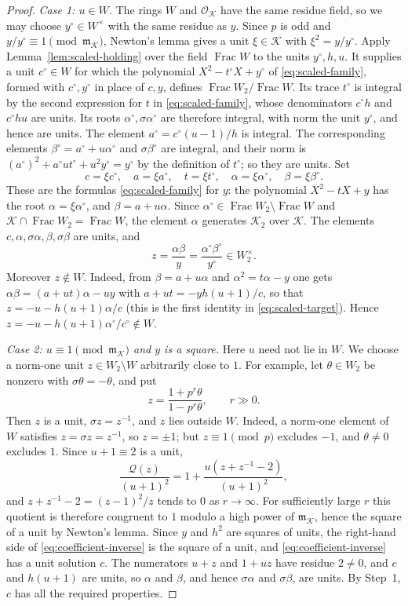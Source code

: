 \documentclass[11pt]{article}
\theoremstyle{plain}
\theoremstyle{definition}
\theoremstyle{remark}
\DeclareMathOperator{\Frac}{Frac}
\newcommand{\OO}{\mathcal O}
\begin{document}
\begin{proof}
\emph{Case 1: $u\in W$.}  The rings $W$ and $\OO_{\mathcal K}$ have the
same residue field, so we may choose $y^\circ\in W^\times$ with the same
residue as $y$.  Since $p$ is odd and $y/y^\circ\equiv1\pmod{\mathfrak
m_{\mathcal K}}$, Newton's lemma \cite[Theorem~7.32]{MilneANT} gives a
unit $\xi\in\mathcal K$ with $\xi^2=y/y^\circ$.  Apply
Lemma~\ref{lem:scaled-holding} over the field $\Frac W$ to the units
$y^\circ,h,u$.  It supplies a unit $c^\circ\in W$ for which the
polynomial $X^2-t^\circ X+y^\circ$ of \eqref{eq:scaled-family}, formed
with $c^\circ,y^\circ$ in place of $c,y$, defines $\Frac W_2/\Frac W$.
Its trace $t^\circ$ is integral by the second expression for $t$ in
\eqref{eq:scaled-family}, whose denominators $c^\circ h$ and
$c^\circ hu$ are units.  Its roots $\alpha^\circ,\sigma\alpha^\circ$ are
therefore integral, with norm the unit $y^\circ$, and hence are units.
The element $a^\circ=c^\circ(u-1)/h$ is integral.  The corresponding
elements $\beta^\circ=a^\circ+u\alpha^\circ$ and $\sigma\beta^\circ$ are
integral, and their norm is
$(a^\circ)^2+a^\circ ut^\circ+u^2y^\circ=y^\circ$ by the definition of
$t^\circ$; so they are units.  Set
\[
 c=\xi c^\circ,\quad a=\xi a^\circ,\quad t=\xi t^\circ,\quad
 \alpha=\xi\alpha^\circ,\quad\beta=\xi\beta^\circ.
\]
These are the formulas \eqref{eq:scaled-family} for $y$: the polynomial
$X^2-tX+y$ has the root $\alpha=\xi\alpha^\circ$, and
$\beta=a+u\alpha$.  Since $\alpha^\circ\in\Frac W_2\setminus\Frac W$ and
$\mathcal K\cap\Frac W_2=\Frac W$, the element $\alpha$ generates
$\mathcal K_2$ over $\mathcal K$.  The elements $c,\alpha,\sigma\alpha,
\beta,\sigma\beta$ are units, and
\[
 z=\frac{\alpha\beta}{y}=\frac{\alpha^\circ\beta^\circ}{y^\circ}\in
 W_2^\times.
\]
Moreover $z\notin W$.  Indeed, from $\beta=a+u\alpha$ and
$\alpha^2=t\alpha-y$ one gets $\alpha\beta=(a+ut)\alpha-uy$ with
$a+ut=-yh(u+1)/c$, so that $z=-u-h(u+1)\alpha/c$ (this is the first
identity in \eqref{eq:scaled-target}).  Hence
$z=-u-h(u+1)\alpha^\circ/c^\circ\notin W$.

\emph{Case 2: $u\equiv1\pmod{\mathfrak m_{\mathcal K}}$ and $y$ is a
square.}  Here $u$ need not lie in $W$.  We choose a norm-one unit
$z\in W_2\setminus W$ arbitrarily close to $1$.  For example, let
$\theta\in W_2$ be nonzero with $\sigma\theta=-\theta$, and put
\[
 z=\frac{1+p^r\theta}{1-p^r\theta},\qquad r\gg0.
\]
Then $z$ is a unit, $\sigma z=z^{-1}$, and $z$ lies outside $W$.
Indeed, a norm-one element of $W$ satisfies $z=\sigma z=z^{-1}$, so
$z=\pm1$; but $z\equiv1\pmod p$ excludes $-1$, and $\theta\ne0$
excludes $1$.  Since $u+1\equiv2$ is a unit,
\[
 \frac{\mathcal Q(z)}{(u+1)^2}
   =1+\frac{u(z+z^{-1}-2)}{(u+1)^2},
\]
and $z+z^{-1}-2=(z-1)^2/z$ tends to $0$ as $r\to\infty$.  For
sufficiently large $r$ this quotient is therefore congruent to $1$
modulo a high power of $\mathfrak m_{\mathcal K}$, hence the square of a
unit by Newton's lemma.  Since $y$ and $h^2$ are squares of units, the
right-hand side of \eqref{eq:coefficient-inverse} is the square of a
unit, and \eqref{eq:coefficient-inverse} has a unit solution $c$.  The
numerators $u+z$ and $1+uz$ have residue $2\ne0$, and $c$ and $h(u+1)$
are units, so $\alpha$ and $\beta$, and hence $\sigma\alpha$ and
$\sigma\beta$, are units.  By Step~1, $c$ has all the required
properties.


\end{proof}
\end{document}
